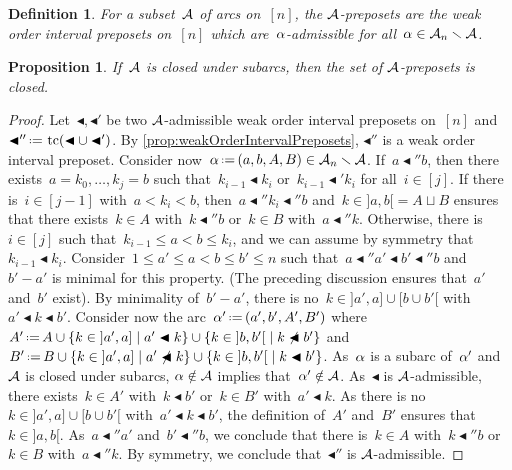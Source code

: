 \documentclass[leqno, 12pt]{amsart}
\numberwithin{equation}{section}
\newcommand{\darkblue}{\color{darkblue}} %
\newcommand{\defn}[1]{\textsl{\darkblue #1}} %
\DeclareMathOperator{\tc}{tc}
\newcommand{\set}[2]{\left\{ #1 \;\middle|\; #2 \right\}} %
\newcommand{\eqdef}{\mbox{\,\raisebox{0.2ex}{\scriptsize\ensuremath{\mathrm:}}\ensuremath{=}\,}} %
\newcommand{\ssm}{\smallsetminus} %
\numberwithin{equation}{section}
\newtheorem{prop}[thm]{Proposition}
\newtheorem{defi}[thm]{Definition}
\theoremstyle{remark}
\begin{document}
\begin{defi}
For a subset~$\mathcal{A}$ of arcs on~$[n]$, the \defn{$\mathcal{A}$-preposets} are the weak order interval preposets on~$[n]$ which are~$\alpha$-admissible for all~$\arc \in \arcs_n \ssm \arcs$.
\end{defi}

\begin{prop}
\label{prop:arcsPreposets}
If~$\mathcal{A}$ is closed under subarcs, then the set of $\mathcal{A}$-preposets is closed.
\end{prop}

\begin{proof}
Let~${\blacktriangleleft}, {\blacktriangleleft'}$ be two $\mathcal{A}$-admissible weak order interval preposets on~$[n]$ and~${\blacktriangleleft''} \eqdef  \tc({\blacktriangleleft} \cup {\blacktriangleleft'})$.
By \cref{prop:weakOrderIntervalPreposets}, $\blacktriangleleft''$ is a weak order interval preposet.
Consider now~$\arc \eqdef (a, b, A, B) \in \arcs_n \ssm \arcs$.
If~$a \blacktriangleleft'' b$, then there exists~$a = k_0, \dots, k_j = b$ such that~$k_{i-1} \blacktriangleleft k_i$ or~$k_{i-1} \blacktriangleleft' k_i$ for all~$i \in [j]$.
If there is~$i \in [j-1]$ with~$a < k_i < b$, then~$a \blacktriangleleft'' k_i \blacktriangleleft'' b$ and~$k \in {]a,b[} = A \sqcup B$ ensures that there exists~$k \in A$ with~$k \blacktriangleleft'' b$ or~$k \in B$ with~$a \blacktriangleleft'' k$.
Otherwise, there is~$i \in [j]$ such that~$k_{i-1} \le a < b \le k_i$, and we can assume by symmetry that~$k_{i-1} \blacktriangleleft k_i$.
Consider~$1 \le a' \le a < b \le b' \le n$ such that~$a \blacktriangleleft'' a' \blacktriangleleft b' \blacktriangleleft'' b$ and~$b' - a'$ is minimal for this property.
(The preceding discussion ensures that~$a'$ and~$b'$ exist).
By minimality of~$b'-a'$, there is no~$k \in {]a',a]} \cup {[b \cup b'[}$ with~$a' \blacktriangleleft k \blacktriangleleft b'$.
Consider now the arc~$\arc' \eqdef (a', b', A', B')$ where~$A' \eqdef A \cup \set{k \in {]a',a]}}{a' \blacktriangleleft k} \cup \set{k \in {]b,b'[}}{k \not\blacktriangleleft b'}$ and~$B' \eqdef B  \cup \set{k \in {]a',a]}}{a' \not\blacktriangleleft k} \cup \set{k \in {]b,b'[}}{k \blacktriangleleft b'}$.
As~$\alpha$ is a subarc of~$\alpha'$ and~$\mathcal{A}$ is closed under subarcs, $\alpha \notin \mathcal{A}$ implies that~$\alpha' \notin \mathcal{A}$.
As~$\blacktriangleleft$ is $\mathcal{A}$-admissible, there exists~$k \in A'$ with~$k \blacktriangleleft b'$ or~$k \in B'$ with~$a' \blacktriangleleft k$.
As there is no~$k \in {]a',a]} \cup {[b \cup b'[}$ with~$a' \blacktriangleleft k \blacktriangleleft b'$, the definition of~$A'$ and~$B'$ ensures that~$k \in {]a,b[}$.
As~$a \blacktriangleleft'' a'$ and~$b' \blacktriangleleft'' b$, we conclude that there is~$k \in A$ with~$k \blacktriangleleft'' b$ or~$k \in B$ with~$a \blacktriangleleft'' k$.
By symmetry, we conclude that~$\blacktriangleleft''$ is $\mathcal{A}$-admissible.
\end{proof}
\end{document}
